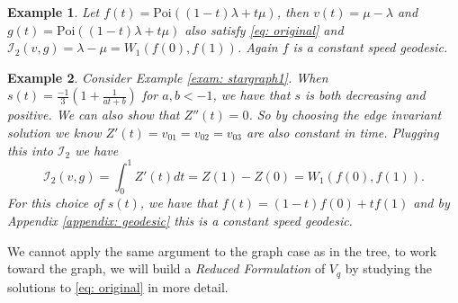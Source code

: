 \documentclass[conference]{IEEEtran}
\theoremstyle{ieeestyle}
\newtheorem{exam}{Example}
\begin{document}
\begin{exam}\label{examp: poi}
    Let $f(t) = \text{Poi}((1-t)\lambda + t\mu)$, then $v(t) = \mu - \lambda$ and $g(t) = \text{Poi}((1-t)\lambda + t\mu)$ also  satisfy \eqref{eq: original} and $\mathcal{I}_2(v,g) = \lambda - \mu = W_1(f(0),f(1))$. Again $f$ is a constant speed geodesic.
\end{exam}
\begin{exam}\label{examp: star graph}
Consider Example \ref{exam: stargraph1}. When $s(t) = \frac{-1}{3}(1 + \frac{1}{at+b})$ for $a,b < -1$, we have that $s$ is both decreasing and positive. We can also show that $Z''(t) = 0$. So by choosing the edge invariant solution we know $Z'(t) = v_{01} = v_{02} = v_{03}$ are also constant in time. Plugging this into $\mathcal{I}_2$ we have
\begin{equation*}
    \mathcal{I}_2(v,g) = \int_0^1 Z'(t) dt = Z(1) - Z(0) = W_1(f(0),f(1)).
\end{equation*}
For this choice of $s(t)$, we have that $f(t) = (1-t)f(0) + tf(1)$ and by Appendix \ref{appendix: geodesic} this is a constant speed geodesic.
\end{exam}
We cannot apply the same argument to the graph case as in the tree, to work toward the graph, we will build a \textit{Reduced Formulation} of $V_q$ by studying the solutions to \eqref{eq: original} in more detail.
\end{document}
